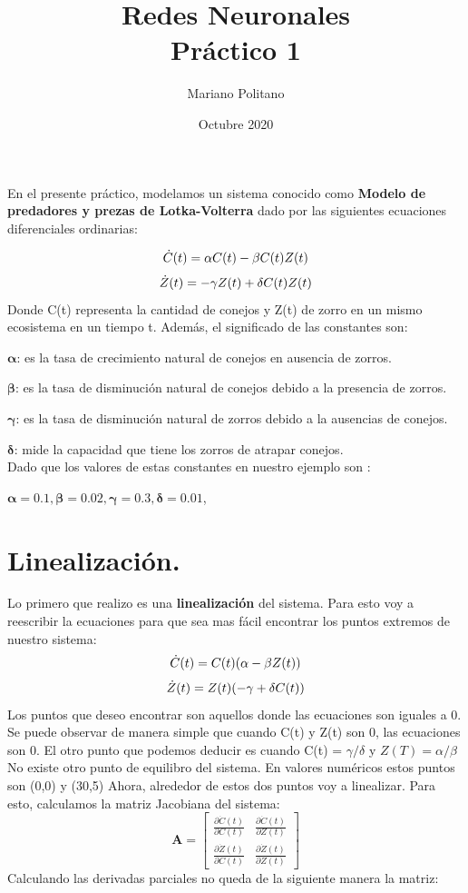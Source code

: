 \documentclass{article}
\title{Redes Neuronales \\
  \large Práctico 1 \\
  }
\author{Mariano Politano }
\date{Octubre 2020}
\begin{document}
\maketitle

En el presente práctico, modelamos un sistema conocido como\textbf{ Modelo de predadores y prezas de Lotka-Volterra }dado por las siguientes ecuaciones diferenciales ordinarias:

\begin{equation*}
\notag
\dot{C}(t) = \alpha C(t) - \beta C(t)Z(t)
\end{equation*}
\begin{equation}
\notag
\dot{Z}(t) = - \gamma Z(t) + \delta C(t)Z(t)
\end{equation}
Donde C(t) representa la cantidad de conejos y Z(t) de zorro en un mismo ecosistema en un tiempo t. Además, el significado de las constantes son:

$\boldsymbol\alpha$: es la tasa de crecimiento natural de conejos en ausencia de zorros.

$\boldsymbol\beta$: es la tasa de disminución natural de conejos debido a la presencia de zorros.

$\boldsymbol\gamma$: es la tasa de disminución natural de zorros debido a la ausencias de conejos.

$\boldsymbol\delta$: mide la capacidad que tiene los zorros de atrapar conejos.
\\
Dado que los valores de estas constantes en nuestro ejemplo son :

$\boldsymbol{\alpha = 0.1 , \beta = 0.02  , \gamma = 0.3  , \delta = 0.01}$, 

\section{Linealización.}
Lo primero que realizo es una \textbf{linealización} del sistema. Para esto voy a reescribir la ecuaciones para que sea mas fácil encontrar los puntos extremos de nuestro sistema:
\begin{equation*}
\notag
\dot{C}(t) = C(t) (\alpha - \beta Z(t))
\end{equation*}
\begin{equation}
\notag
\dot{Z}(t) = Z(t) (- \gamma + \delta C(t))
\end{equation}
Los puntos que deseo encontrar son aquellos donde las ecuaciones son iguales a 0. Se puede observar de manera simple que cuando C(t) y Z(t) son 0, las ecuaciones son 0.  El otro punto que podemos deducir es cuando C(t) = $\gamma/\delta$ y $Z(T) =  \alpha/\beta$ No existe otro punto de equilibro del sistema.
En valores numéricos estos puntos son (0,0) y (30,5)
Ahora, alrededor de estos dos puntos voy a linealizar. Para esto, calculamos la matriz Jacobiana del sistema:
\[
\mathbf{A} =
\begin{bmatrix}
  \frac{\partial \dot{C}(t)} {\partial {C}(t)} & 
    \frac{\partial \dot{C}(t)} {\partial {Z}(t)} \\[1ex] %
 \frac{\partial \dot{Z}(t)} {\partial {C}(t)} & 
 \frac{\partial \dot{Z}(t)} {\partial {Z}(t)}
\end{bmatrix}
\]
Calculando las derivadas parciales no queda de la siguiente manera la matriz:
\end{document}
